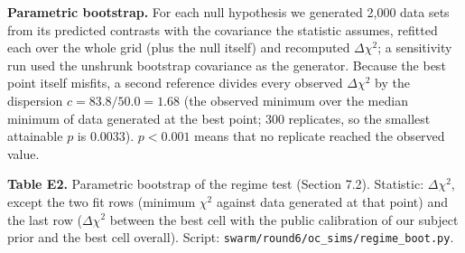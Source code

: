 \documentclass[
]{article}
\begin{document}
\textbf{Parametric bootstrap.} For each null hypothesis we generated
2,000 data sets from its predicted contrasts with the covariance the
statistic assumes, refitted each over the whole grid (plus the null
itself) and recomputed \(\Delta\chi^2\); a sensitivity run used the
unshrunk bootstrap covariance as the generator. Because the best point
itself misfits, a second reference divides every observed
\(\Delta\chi^2\) by the dispersion \(c = 83.8/50.0 = 1.68\) (the
observed minimum over the median minimum of data generated at the best
point; 300 replicates, so the smallest attainable \(p\) is 0.0033).
\(p < 0.001\) means that no replicate reached the observed value.

\textbf{Table E2.} Parametric bootstrap of the regime test (Section
7.2). Statistic: \(\Delta\chi^2\), except the two fit rows (minimum
\(\chi^2\) against data generated at that point) and the last row
(\(\Delta\chi^2\) between the best cell with the public calibration of
our subject prior and the best cell overall). Script:
\texttt{swarm/round6/oc\_sims/regime\_boot.py}.
\end{document}

